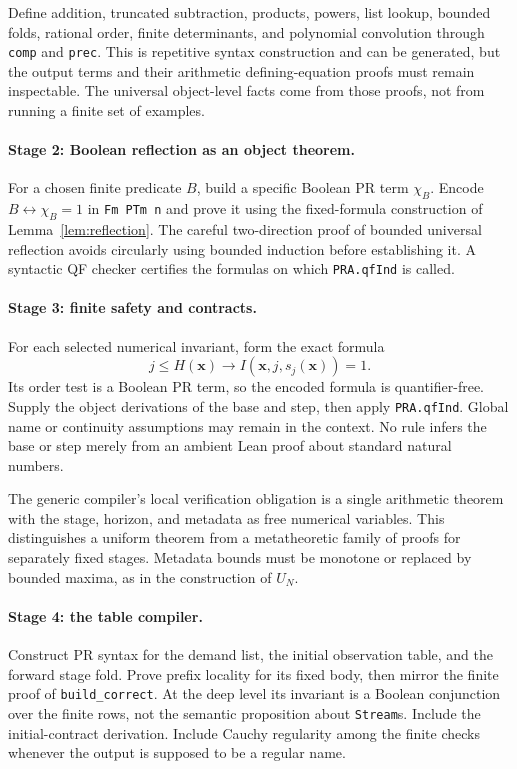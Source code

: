Define addition, truncated subtraction, products, powers, list lookup,
bounded folds, rational order, finite determinants, and polynomial
convolution through \texttt{comp} and \texttt{prec}. This is repetitive
syntax construction and can be generated, but the output terms and their
arithmetic defining-equation proofs must remain inspectable. The
universal object-level facts come from those proofs, not from running a
finite set of examples.

\paragraph{Stage 2: Boolean reflection as an object theorem.}
For a chosen finite predicate $B$, build a specific Boolean PR term
$\chi_B$. Encode $B\leftrightarrow\chi_B=1$ in
\texttt{Fm PTm n} and prove it using the fixed-formula construction of
Lemma~\ref{lem:reflection}. The careful two-direction proof of bounded
universal reflection avoids circularly using bounded induction before
establishing it. A syntactic QF checker certifies the formulas on which
\texttt{PRA.qfInd} is called.

\paragraph{Stage 3: finite safety and contracts.}
For each selected numerical invariant, form the exact formula
\[
 j\le H(\mathbf x)\longrightarrow
   I(\mathbf x,j,s_j(\mathbf x))=1.
\]
Its order test is a Boolean PR term, so the encoded formula is
quantifier-free. Supply the object derivations of the base and step,
then apply \texttt{PRA.qfInd}. Global name or continuity assumptions
may remain in the context. No rule infers the base or step merely from
an ambient Lean proof about standard natural numbers.

The generic compiler's local verification obligation is a single
arithmetic theorem with the stage, horizon, and metadata as free
numerical variables. This distinguishes a uniform theorem from a
metatheoretic family of proofs for separately fixed stages. Metadata
bounds must be monotone or replaced by bounded maxima, as in the
construction of $U_N$.

\paragraph{Stage 4: the table compiler.}
Construct PR syntax for the demand list, the initial observation table,
and the forward stage fold. Prove prefix locality for its fixed body,
then mirror the finite proof of \texttt{build\_correct}. At the deep
level its invariant is a Boolean conjunction over the finite rows,
not the semantic proposition about \texttt{Stream}s. Include the
initial-contract derivation. Include Cauchy regularity among the finite
checks whenever the output is supposed to be a regular name.


